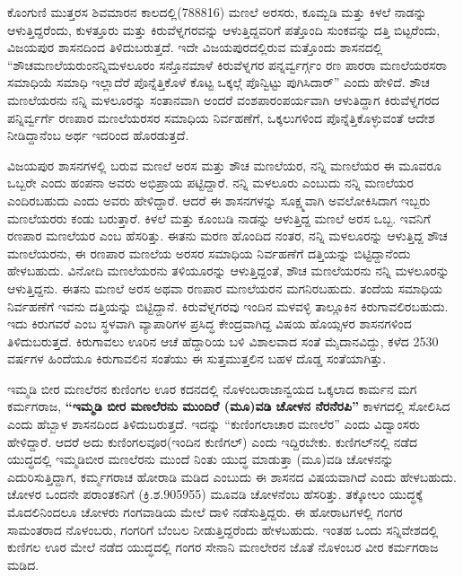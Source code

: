 ಕೊಂಗುಣಿ ಮುತ್ತರಸ ಶಿವಮಾರನ ಕಾಲದಲ್ಲಿ(788816) ಮಣಲೆ ಅರಸರು, ಕೂಮ್ಬಡಿ ಮತ್ತು ಕಿಳಲೆ ನಾಡನ್ನು ಆಳುತ್ತಿದ್ದರೆಂದು, ಕುಳತ್ತೂರು ಮತ್ತು ಕಿರುವೆಳ್ನಗರವನ್ನು ಆಳುತ್ತಿದ್ದವರಿಗೆ ಪತ್ತೊಂದಿ ಸುಂಕವನ್ನು ದತ್ತಿ ಬಿಟ್ಟರೆಂದು, ವಿಜಯಪುರ ಶಾಸನದಿಂದ ತಿಳಿದುಬರುತ್ತದೆ. ಇದೇ ವಿಜಯಪುರದಲ್ಲಿರುವ ಮತ್ತೊಂದು ಶಾಸನದಲ್ಲಿ “ಶೌಚಮಣಲೆಯರುಂ\break ನನ್ನಿಮಳಲೂರಂ ಸನ್ತೊನಮಾಳೆ ಕಿರುವೆಳ್ನಗರ ಪನ್ನರ್ವ್ವರ್ಗ್ಗಂ ರಣ ಪಾರರಾ ಮಣಲೆಯರಸರಾ ಸಮಾಧಿಯೆ ಸಮಾಧಿ ಇಲ್ಲಾದೆರೆ ಪೊನ್ನೆತ್ತಿಕೊಳೆ ಕೊಟ್ಟ ಒಕ್ಕಲ್ಗೆ ಪೊನ್ವಿಟ್ಟು ಪುಗಿಸಿದಾರ್​” ಎಂದು ಹೇಳಿದೆ. ಶೌಚ ಮಣಲೆಯರನು ನನ್ನಿ ಮಳಲೂರನ್ನು ಸಂತಾನವಾಗಿ ಅಂದರೆ ವಂಶಪಾರಂಪರ್ಯವಾಗಿ ಆಳುತಿದ್ದಾಗ ಕಿರುವೆಳ್ನಗರದ ಪನ್ನಿರ್ವ್ವರ್ಗೆ ರಣಪಾರ ಮಣಲೆಯರಸರ ಸಮಾಧಿಯ ನಿರ್ವಹಣೆಗೆ, ಒಕ್ಕಲುಗಳಿಂದ ಪೊನ್ನೆತ್ತಿಕೊಳ್ಳುವಂತೆ ಆದೇಶ ನೀಡಿದ್ದಾನೆಂಬ ಅರ್ಥ ಇದರಿಂದ ಹೊರಡುತ್ತದೆ. 

ವಿಜಯಪುರ ಶಾಸನಗಳಲ್ಲಿ ಬರುವ ಮಣಲೆ ಅರಸ ಮತ್ತು ಶೌಚ ಮಣಲೆಯರ, ನನ್ನಿ ಮಣಲೆಯರ ಈ ಮೂವರೂ ಒಬ್ಬರೇ ಎಂದು ಹಂಪನಾ ಅವರು ಅಭಿಪ್ರಾಯ ಪಟ್ಟಿದ್ದಾರೆ. ನನ್ನಿ ಮಳಲೂರು ಎಂಬುದು ನನ್ನಿ ಮಣಲೆಯರ ಎಂದಿರಬಹುದು ಎಂದು ಅವರು ಹೇಳಿದ್ದಾರೆ. ಆದರೆ ಈ ಶಾಸನಗಳನ್ನು ಸೂಕ್ಷ್ಮವಾಗಿ ಅವಲೋಕಿಸಿದಾಗ ಇಬ್ಬರು ಮಣಲೆಯರರು ಕಂಡು ಬರುತ್ತಾರೆ. ಕಿಳಲೆ ಮತ್ತು ಕೂಂಬಡಿ ನಾಡನ್ನು ಆಳುತ್ತಿದ್ದ ಮಣಲೆ ಅರಸ ಒಬ್ಬ. ಇವನಿಗೆ ರಣಪಾರ ಮಣಲೆಯರ ಎಂಬ ಹೆಸರಿತ್ತು. ಈತನು ಮರಣ ಹೊಂದಿದ ನಂತರ, ನನ್ನಿ ಮಳಲೂರನ್ನು ಆಳುತ್ತಿದ್ದ ಶೌಚ ಮಣಲೆಯರನು, ಈ ರಣಪಾರ ಮಣಲೆಯ ಅರಸರ ಸಮಾಧಿಯ ನಿರ್ವಹಣೆಗೆ ದತ್ತಿಯನ್ನು ಬಿಟ್ಟಿದ್ದಾನೆಂದು ಹೇಳಬಹುದು. ವಿನೋದಿ ಮಣಲೆಯರನು ತಳಿಯೂರನ್ನು ಆಳುತ್ತಿದ್ದಂತೆ, ಶೌಚ ಮಣಲೆಯರನು ನನ್ನಿ ಮಳಲೂರನ್ನು ಆಳುತ್ತಿದ್ದನು. ಈತನು ಮಣಲೆ ಅರಸ ಅಥವಾ ರಣಪಾರ ಮಣಲೆಯರನ ಮಗನಿರಬಹುದು. ತಂದೆಯ ಸಮಾಧಿಯ ನಿರ್ವಹಣೆಗೆ ಇವನು ದತ್ತಿಯನ್ನು ಬಿಟ್ಟಿದ್ದಾನೆ. ಕಿರುವೆಳ್ನಗರವು ಇಂದಿನ ಮಳವಳ್ಳಿ ತಾಲ್ಲೂಕಿನ ಕಿರುಗಾವಲಿರಬಹುದು. ಇದು ಕಿರುಗವರೆ ಎಂಬ ಸ್ಥಳವಾಗಿ ವ್ಯಾಪಾರಿಗಳ ಪ್ರಸಿದ್ಧ ಕೇಂದ್ರವಾಗಿದ್ದ ವಿಷಯ ಹೊಯ್ಸಳರ ಶಾಸನಗಳಿಂದ ತಿಳಿದುಬರುತ್ತದೆ. ಕಿರುಗಾವಲು ಊರಿನ ಆಚೆ ಹೆದ್ದಾರಿಯ ಬಳಿ ವಿಶಾಲವಾದ ಸಂತೆ ಮೈದಾನವಿದ್ದು, ಕಳೆದ 2530 ವರ್ಷಗಳ ಹಿಂದೆಯೂ ಕಿರುಗಾವಲಿನ ಸಂತೆಯು ಈ ಸುತ್ತಮುತ್ತಲಿನ ಬಹಳ ದೊಡ್ಡ ಸಂತೆಯಾಗಿತ್ತು. 

ಇಮ್ಮಡಿ ಬೀರ ಮಣಲೆರನ ಕುಣಿಂಗಲ ಊರ ಕದನದಲ್ಲಿ ನೊಳಂಬರಾಜಾನ್ವಯದ ಒಕ್ಕಲಾದ ಕಾರ್ಮನ ಮಗ ಕರ್ಮಗರಾಜ, \textbf{“ಇಮ್ಮಡಿ ಬೀರ ಮಣಲೆರನು ಮುಂದಿರೆ (ಮೂ)ವಡಿ ಚೋಳನ ನೆರನೆರಪಿ”} ಕಾಳಗದಲ್ಲಿ ಸೋಲಿಸಿದ ಎಂದು ಹೆಬ್ಬಾಳ ಶಾಸನದಿಂದ ತಿಳಿದುಬರುತ್ತದೆ. ಇದನ್ನು “ಕುಣಿಂಗಲಾಚಾರ ಮಣಲೆರ” ಎಂದು ವಿದ್ವಾಂಸರು ಹೇಳಿದ್ದಾರೆ. ಆದರೆ ಅದು ಕುಣಿಂಗಲವೂರ(ಇಂದಿನ ಕುಣಿಗಲ್​) ಎಂದು ಇದ್ದಿರಬೇಕು. ಕುಣಿಗಲ್​ನಲ್ಲಿ ನಡೆದ ಯುದ್ಧದಲ್ಲಿ ಇಮ್ಮಡಿಬೀರ ಮಣಲೆರನು ಮುಂದೆ ನಿಂತು ಯುದ್ಧ ಮಾಡುತ್ತಾ (ಮೂ)ವಡಿ ಚೋಳನನ್ನು ಎದುರಿಸುತ್ತಿದ್ದಾಗ, ಕರ್ಮ್ಮಗರಾಚ ಹೋರಾಡಿ ಮಡಿದ ಎಂಬುದು ಈ ಶಾಸನದ ವಿಷಯವಾಗಿದೆ ಎಂದು ಹೇಳಬಹುದು. ಚೋಳರ ಒಂದನೇ ಪರಾಂತಕನಿಗೆ (ಕ್ರಿ.ಶ.905955) ಮೂವಡಿ ಚೋಳನೆಂಬ ಹೆಸರಿತ್ತು. ತಕ್ಕೋಲಂ ಯುದ್ಧಕ್ಕೆ ಮೊದಲಿನಿಂದಲೂ ಚೋಳರು ಗಂಗವಾಡಿಯ ಮೇಲೆ ದಾಳಿ ನಡೆಸುತ್ತಿದ್ದರು. ಈ ಹೋರಾಟಗಳಲ್ಲಿ ಗಂಗರ ಸಾಮಂತರಾದ ನೊಳಂಬರು, ಗಂಗರಿಗೆ ಬೆಂಬಲ ನೀಡುತ್ತಿದ್ದರೆಂದು ಹೇಳಬಹುದು. ಇಂತಹ ಒಂದು ಸನ್ನಿವೇಶದಲ್ಲಿ ಕುಣಿಗಲ ಊರ ಮೇಲೆ ನಡೆದ ಯುದ್ಧದಲ್ಲಿ ಗಂಗರ ಸೇನಾನಿ ಮಣಲೇರನ ಜೊತೆ ನೊಳಂಬರ ವೀರ ಕರ್ಮಗರಾಜ ಮಡಿದ.

